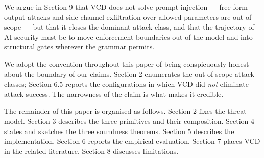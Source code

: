 We argue in Section 9 that VCD does not solve prompt injection ---
free-form output attacks and side-channel exfiltration over allowed
parameters are out of scope --- but that it closes the dominant attack
class, and that the trajectory of AI security must be to move
enforcement boundaries out of the model and into structural gates
wherever the grammar permits.

We adopt the convention throughout this paper of being conspicuously
honest about the boundary of our claims. Section 2 enumerates the
out-of-scope attack classes; Section 6.5 reports the configurations in
which VCD did \emph{not} eliminate attack success. The narrowness of the
claim is what makes it credible.

The remainder of this paper is organised as follows. Section 2 fixes the
threat model. Section 3 describes the three primitives and their
composition. Section 4 states and sketches the three soundness theorems.
Section 5 describes the implementation. Section 6 reports the empirical
evaluation. Section 7 places VCD in the related literature. Section 8
discusses limitations.
